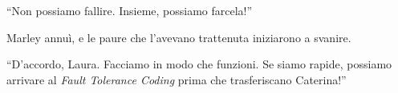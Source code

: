 \begin{center}
\begin{minipage}{0.7\textwidth}
    \centering
\end{minipage}
\end{center}


\begin{dialogue}
 \enquote{Non possiamo fallire. Insieme, possiamo farcela!}
\end{dialogue}

Marley annuì, e le paure che l'avevano trattenuta iniziarono a svanire.

\begin{dialogue}
 \enquote{D'accordo, Laura. Facciamo in modo che funzioni. Se siamo rapide, possiamo arrivare al \textit{Fault Tolerance Coding} prima che trasferiscano Caterina!}
\end{dialogue}

